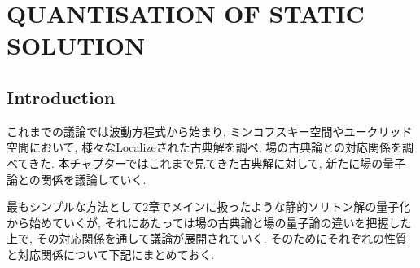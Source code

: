 \documentclass[dvipdfmx,11pt,a4paper,oneside,openany]{jsbook}
\begin{document}


\newcommand{\ctext}[1]{\raise0.2ex\hbox{\textcircled{\scriptsize{#1}}}}

\renewcommand{\figurename}{Fig. }

\renewcommand{\thefigure}{\arabic{figure}}

\setcounter{chapter}{4}
\chapter{QUANTISATION OF STATIC SOLUTION}
\section{Introduction}
これまでの議論では波動方程式から始まり, ミンコフスキー空間やユークリッド空間において, 様々なLocalizeされた古典解を調べ, 場の古典論との対応関係を調べてきた. 本チャプターではこれまで見てきた古典解に対して, 新たに場の量子論との関係を議論していく. %

最もシンプルな方法として2章でメインに扱ったような静的ソリトン解の量子化から始めていくが, それにあたっては場の古典論と場の量子論の違いを把握した上で, その対応関係を通して議論が展開されていく. そのためにそれぞれの性質と対応関係について下記にまとめておく.
\end{document}
